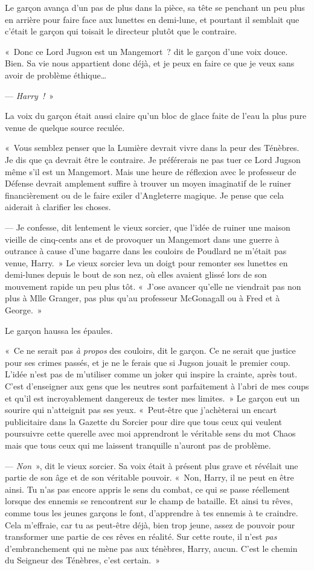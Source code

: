 Le garçon avança d'un pas de plus dans la pièce, sa tête se penchant un peu plus en arrière pour faire face aux lunettes en demi-lune, et pourtant il semblait que c'était le garçon qui toisait le directeur plutôt que le contraire.

«~Donc ce Lord Jugson est un Mangemort~? dit le garçon d'une voix douce. Bien. Sa vie nous appartient donc déjà, et je peux en faire ce que je veux sans avoir de problème éthique…

--- \emph{Harry~!}~»

La voix du garçon était aussi claire qu'un bloc de glace faite de l'eau la plus pure venue de quelque source reculée.

«~Vous semblez penser que la Lumière devrait vivre dans la peur des Ténèbres. Je dis que ça devrait être le contraire. Je préférerais ne pas tuer ce Lord Jugson même s'il est un Mangemort. Mais une heure de réflexion avec le professeur de Défense devrait amplement suffire à trouver un moyen imaginatif de le ruiner financièrement ou de le faire exiler d'Angleterre magique. Je pense que cela aiderait à clarifier les choses.

--- Je confesse, dit lentement le vieux sorcier, que l'idée de ruiner une maison vieille de cinq-cents ans et de provoquer un Mangemort dans une guerre à outrance à cause d'une bagarre dans les couloirs de Poudlard ne m'était pas venue, Harry.~» Le vieux sorcier leva un doigt pour remonter ses lunettes en demi-lunes depuis le bout de son nez, où elles avaient glissé lors de son mouvement rapide un peu plus tôt. «~J'ose avancer qu'elle ne viendrait pas non plus à Mlle Granger, pas plus qu'au professeur McGonagall ou à Fred et à George.~»

Le garçon haussa les épaules.

«~Ce ne serait pas \emph{à propos} des couloirs, dit le garçon. Ce ne serait que justice pour ses crimes passés, et je ne le ferais que si Jugson jouait le premier coup. L'idée n'est pas de m'utiliser comme un joker qui inspire la crainte, après tout. C'est d'enseigner aux gens que les neutres sont parfaitement à l'abri de mes coups et qu'il est incroyablement dangereux de tester mes limites.~» Le garçon eut un sourire qui n'atteignit pas ses yeux. «~Peut-être que j'achèterai un encart publicitaire dans la Gazette du Sorcier pour dire que tous ceux qui veulent poursuivre cette querelle avec moi apprendront le véritable sens du mot Chaos mais que tous ceux qui me laissent tranquille n'auront pas de problème.

--- \emph{Non}~», dit le vieux sorcier. Sa voix était à présent plus grave et révélait une partie de son âge et de son véritable pouvoir. «~Non, Harry, il ne peut en être ainsi. Tu n'as pas encore appris le sens du combat, ce qui se passe réellement lorsque des ennemis se rencontrent sur le champ de bataille. Et ainsi tu rêves, comme tous les jeunes garçons le font, d'apprendre à tes ennemis à te craindre. Cela m'effraie, car tu as peut-être déjà, bien trop jeune, assez de pouvoir pour transformer une partie de ces rêves en réalité. Sur cette route, il n'est \emph{pas} d'embranchement qui ne mène pas aux ténèbres, Harry, aucun. C'est le chemin du Seigneur des Ténèbres, c'est certain.~»

